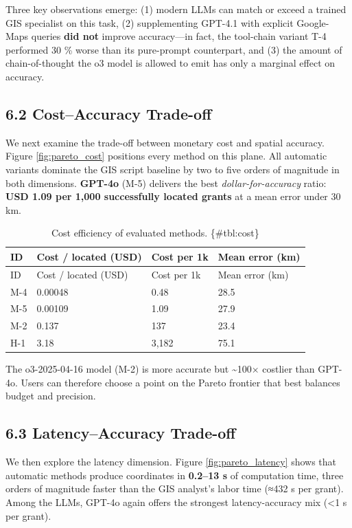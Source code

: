 \documentclass[
  11pt,
]{article}
\begin{document}
Three key observations emerge: (1) modern LLMs can match or exceed a
trained GIS specialist on this task, (2) supplementing GPT-4.1 with
explicit Google-Maps queries \textbf{did not} improve accuracy---in
fact, the tool-chain variant T-4 performed 30 \% worse than its
pure-prompt counterpart, and (3) the amount of chain-of-thought the o3
model is allowed to emit has only a marginal effect on accuracy.

\subsection{6.2 Cost--Accuracy Trade-off}\label{costaccuracy-trade-off}

We next examine the trade-off between monetary cost and spatial
accuracy. Figure \autoref{fig:pareto_cost} positions every method on
this plane. All automatic variants dominate the GIS script baseline by
two to five orders of magnitude in both dimensions. \textbf{GPT-4o}
(M-5) delivers the best \emph{dollar-for-accuracy} ratio: \textbf{USD
1.09 per 1,000 successfully located grants} at a mean error under 30 km.

\begin{longtable}[]{@{}llll@{}}
\caption{Cost efficiency of evaluated methods.
\{\#tbl:cost\}}\tabularnewline
\toprule\noalign{}
ID & Cost / located (USD) & Cost per 1k & Mean error (km) \\
\midrule\noalign{}
\endfirsthead
\toprule\noalign{}
ID & Cost / located (USD) & Cost per 1k & Mean error (km) \\
\midrule\noalign{}
\endhead
\bottomrule\noalign{}
\endlastfoot
M-4 & 0.00048 & 0.48 & 28.5 \\
M-5 & 0.00109 & 1.09 & 27.9 \\
M-2 & 0.137 & 137 & 23.4 \\
H-1 & 3.18 & 3,182 & 75.1 \\
\end{longtable}

The o3-2025-04-16 model (M-2) is more accurate but \textasciitilde100×
costlier than GPT-4o. Users can therefore choose a point on the Pareto
frontier that best balances budget and precision.

\subsection{6.3 Latency--Accuracy
Trade-off}\label{latencyaccuracy-trade-off}

We then explore the latency dimension. Figure
\autoref{fig:pareto_latency} shows that automatic methods produce
coordinates in \textbf{0.2--13 s} of computation time, three orders of
magnitude faster than the GIS analyst's labor time (≈432 s per grant).
Among the LLMs, GPT-4o again offers the strongest latency-accuracy mix
(\textless1 s per grant).
\end{document}
